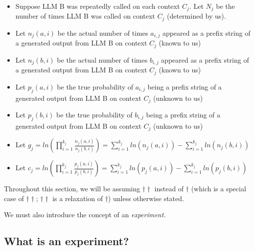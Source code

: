 \documentclass{article}
\begin{document}
\begin{itemize}
\item Suppose LLM B was repeatedly called on each context $\displaystyle C_{j}$. Let $\displaystyle N_{j}$ be the number of times LLM B was called on context $\displaystyle C_{j}$ (determined by us).
\item Let $\displaystyle n_{j}\left( a,i\right)$ be the actual number of times $\displaystyle a_{i,j}$ appeared as a prefix string of a generated output from LLM B on context $\displaystyle C_{j}$ (known to us)
\item Let $\displaystyle n_{j}\left( b,i\right)$ be the actual number of times $\displaystyle b_{i,j}$ appeared as a prefix string of a generated output from LLM B on context $\displaystyle C_{j}$ (known to us)
\item Let $\displaystyle p_{j}\left( a,i\right)$ be the true probability of $\displaystyle a_{i,j}$ being a prefix string of a generated output from LLM B on context $\displaystyle C_{j}$ (unknown to us)
\item Let $\displaystyle p_{j}\left( b,i\right)$ be the true probability of $\displaystyle b_{i,j}$ being a prefix string of a generated output from LLM B on context $\displaystyle C_{j}$ (unknown to us)
\item Let $\displaystyle g_{j} =ln\left(\prod _{i=1}^{k_{j}}\frac{n_{j}\left( a,i\right)}{n_{j}\left( b,i\right)}\right) =\sum _{i=1}^{k_{j}} ln\left( n_{j}\left( a,i\right)\right) -\sum _{i=1}^{k_{j}} ln\left( n_{j}\left( b,i\right)\right)$
\item Let $\displaystyle c_{j} =ln\left(\prod _{i=1}^{k_{j}}\frac{p_{j}\left( a,i\right)}{p_{j}\left( b,i\right)}\right) =\sum _{i=1}^{k_{j}} ln\left( p_{j}\left( a,i\right)\right) -\sum _{i=1}^{k_{j}} ln\left( p_{j}\left( b,i\right)\right)$
\end{itemize}

\begin{mdframed}
Throughout this section, we will be assuming $\dagger\dagger$ instead of $\dagger$ (which is a special case of $\dagger\dagger$; $\dagger\dagger$ is a relaxation of $\dagger$) unless otherwise stated.
\end{mdframed}




We must also introduce the concept of an \textit{experiment.}



\subsection{What is an experiment?}
\end{document}
